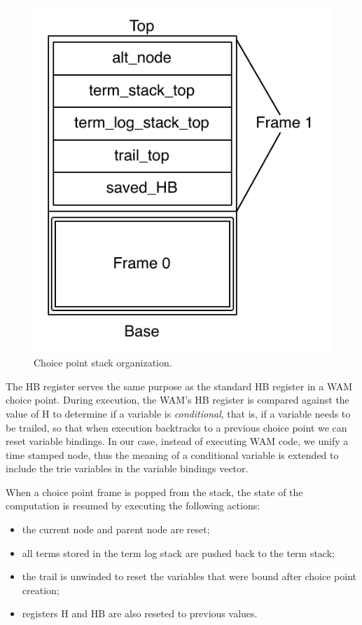 \begin{figure}[H]
  \centering
    \includegraphics[scale=0.45]{choice_point_stack.pdf}
  \caption{Choice point stack organization.}
  \label{fig:choice_point_stack}
\end{figure}

The HB register serves the same purpose as the standard HB register in a WAM choice point.
During execution, the WAM's HB register is compared against the value of H to determine
if a variable is \textit{conditional}, that is, if a variable needs to be trailed, so that
when execution backtracks to a previous choice
point we can reset variable bindings. In our case, instead of executing WAM code, we unify a time stamped node,
thus the meaning of a conditional variable is extended to include the trie variables in the variable bindings vector.

When a choice point frame is popped from the stack, the state of the computation is resumed
by executing the following actions:

\begin{itemize}
  \item the current node and parent node are reset;
  \item all terms stored in the term log stack are pushed back to the term stack;
  \item the trail is unwinded to reset the variables that were bound after choice point creation;
  \item registers H and HB are also reseted to previous values.
\end{itemize}

